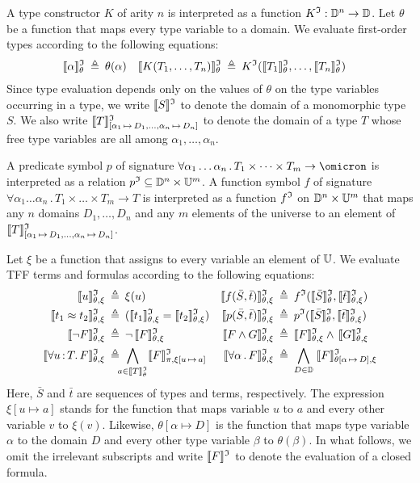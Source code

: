 A type constructor $K$ of arity $n$ is interpreted as a function
$K^{\mathfrak{I}} : \mathbb{D}^n \to \mathbb{D}$.
Let $\theta$ be a function that maps every type variable to
a domain. We evaluate first-order types according to the
following equations:
\begin{align*}
\llbracket\alpha\rrbracket^{\mathfrak{I}}_{\theta} &\:\triangleq\: \theta(\alpha) &
\llbracket K(T_1,\dots,T_n)\rrbracket^{\mathfrak{I}}_{\theta} &\:\triangleq\: K^{\mathfrak{I}}(\llbracket T_1\rrbracket^{\mathfrak{I}}_{\theta},\dots,\llbracket T_n\rrbracket^{\mathfrak{I}}_{\theta})
\end{align*}
Since type evaluation depends only on the values of $\theta$
on the type variables occurring in a type, we write $\llbracket S\rrbracket^{\mathfrak{I}}$
to denote the domain of a monomorphic type $S$. We also write
$\llbracket T\rrbracket^{\mathfrak{I}}_{[\alpha_1\,\mapsto\,D_1,\dots,\alpha_n\,\mapsto\,D_n]}$
to denote the domain of a type $T$ whose free type variables
are all among $\alpha_1,\dots,\alpha_n$.

A predicate symbol $p$ of signature
$\forall \alpha_1\dots\alpha_n \,.\, T_1 \times \dots \times T_m
\to \omicron$ is interpreted as a relation
$p^{\mathfrak{I}} \subseteq \mathbb{D}^n \times \mathbb{U}^m$.
A function symbol $f$ of signature
$\forall \alpha_1\dots\alpha_n \,.\, T_1 \times \dots \times T_m \to T$
is interpreted as a function
$f^{\mathfrak{I}}$ on $\mathbb{D}^n \times \mathbb{U}^m$ that
maps any $n$ domains $D_1,\dots,D_n$ and
any $m$ elements of the universe
to an element of
$\llbracket T\rrbracket^{\mathfrak{I}}_{[\alpha_1\,\mapsto\,D_1,\dots,\alpha_n\,\mapsto\,D_n]}$.

Let $\xi$ be a function that assigns to every variable
an element of $\mathbb{U}$. We evaluate TFF terms and formulas
according to the following equations:
\begin{align*}
\llbracket u\rrbracket^{\mathfrak{I}}_{\theta,\xi} &\:\triangleq\: \xi(u) &
\llbracket f(\bar{S},\bar{t})\rrbracket^{\mathfrak{I}}_{\theta,\xi} &\:\triangleq\: f^{\mathfrak{I}}(\llbracket\bar{S}\rrbracket^{\mathfrak{I}}_{\theta},\llbracket\bar{t}\rrbracket^{\mathfrak{I}}_{\theta,\xi}) \\
\llbracket t_1 \approx t_2\rrbracket^{\mathfrak{I}}_{\theta,\xi} &\:\triangleq\: (\llbracket t_1\rrbracket^{\mathfrak{I}}_{\theta,\xi} = \llbracket t_2\rrbracket^{\mathfrak{I}}_{\theta,\xi}) &
\llbracket p(\bar{S},\bar{t})\rrbracket^{\mathfrak{I}}_{\theta,\xi} &\:\triangleq\: p^{\mathfrak{I}}(\llbracket\bar{S}\rrbracket^{\mathfrak{I}}_{\theta},\llbracket\bar{t}\rrbracket^{\mathfrak{I}}_{\theta,\xi}) \\
\llbracket\lnot F\rrbracket^{\mathfrak{I}}_{\theta,\xi} &\:\triangleq\: \lnot\, \llbracket F\rrbracket^{\mathfrak{I}}_{\theta,\xi} &
\llbracket F \land G\rrbracket^{\mathfrak{I}}_{\theta,\xi} &\:\triangleq\: \llbracket F\rrbracket^{\mathfrak{I}}_{\theta,\xi} \land\, \llbracket G\rrbracket^{\mathfrak{I}}_{\theta,\xi} \\
\llbracket\forall u \operatorname{:} T .\, F\rrbracket^{\mathfrak{I}}_{\theta,\xi} &\:\triangleq\: \!\!\!\!
\bigwedge_{a \in \llbracket T\rrbracket^{\mathfrak{I}}_{\theta}}
\llbracket F \rrbracket^{\mathfrak{I}}_{\pi,\xi[u\,\mapsto\,a]} &
\llbracket\forall \alpha \,.\, F\rrbracket^{\mathfrak{I}}_{\theta,\xi} &\:\triangleq\:
\bigwedge_{D \in \mathbb{D}}\;
\llbracket F \rrbracket^{\mathfrak{I}}_{\theta[\alpha\,\mapsto\,D],\xi}
\end{align*}
Here, $\bar{S}$ and $\bar{t}$ are sequences of types
and terms, respectively. The expression $\xi[u \mapsto a]$
stands for the function that maps
variable $u$ to $a$ and every other variable $v$ to $\xi(v)$.
Likewise, $\theta[\alpha \mapsto D]$ is the function that maps
type variable $\alpha$ to the domain $D$ and every other type
variable $\beta$ to $\theta(\beta)$. In what follows,
we omit the irrelevant subscripts and write $\llbracket F\rrbracket^{\mathfrak{I}}$
to denote the evaluation of a closed formula.

